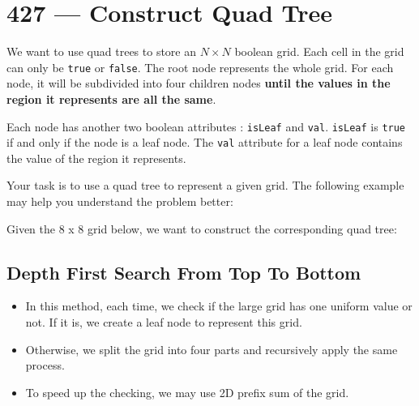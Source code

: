 \section{427 --- Construct Quad Tree}
We want to use quad trees to store an $N \times N$ boolean grid. Each cell in the grid can only be \texttt{true} or \texttt{false}. The root node represents the whole grid. For each node, it will be subdivided into four children nodes \textbf{until the values in the region it represents are all the same}.

Each node has another two boolean attributes : \texttt{isLeaf} and \texttt{val}. \texttt{isLeaf} is \texttt{true} if and only if the node is a leaf node. The \texttt{val} attribute for a leaf node contains the value of the region it represents.

Your task is to use a quad tree to represent a given grid. The following example may help you understand the problem better:

Given the 8 x 8 grid below, we want to construct the corresponding quad tree:


\subsection{Depth First Search From Top To Bottom}
\begin{itemize}
\item In this method, each time, we check if the large grid has one uniform value or not. If it is, we create a leaf node to represent this grid.
\item Otherwise, we split the grid into four parts and recursively apply the same process.
\item To speed up the checking, we may use 2D prefix sum of the grid.
\end{itemize}

